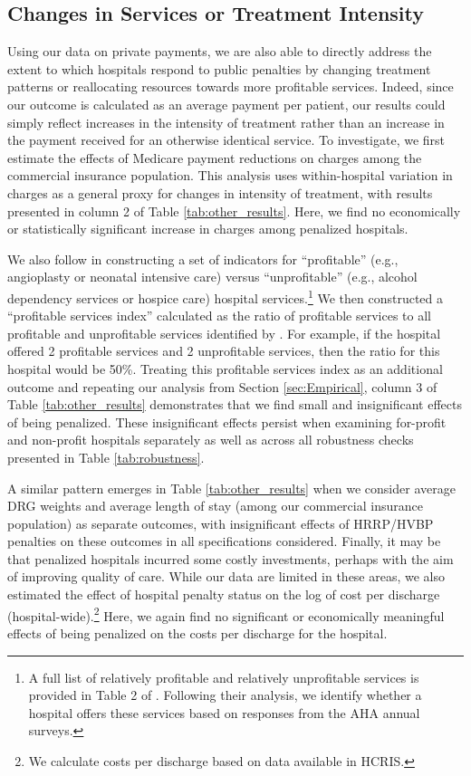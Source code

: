 \documentclass[12pt]{article}
\begin{document}
\subsection{Changes in Services or Treatment Intensity}
Using our data on private payments, we are also able to directly address the extent to which hospitals respond to public penalties by changing treatment patterns or reallocating resources towards more profitable services. Indeed, since our outcome is calculated as an average payment per patient, our results could simply reflect increases in the intensity of treatment rather than an increase in the payment received for an otherwise identical service.  To investigate, we first estimate the effects of Medicare payment reductions on charges among the commercial insurance population. This analysis uses within-hospital variation in charges as a general proxy for changes in intensity of treatment, with results presented in column 2 of Table \ref{tab:other_results}. Here, we find no economically or statistically significant increase in charges among penalized hospitals.

We also follow \cite{horwitz2009} in constructing a set of indicators for ``profitable'' (e.g., angioplasty or neonatal intensive care) versus ``unprofitable'' (e.g., alcohol dependency services or hospice care) hospital services.\footnote{A full list of relatively profitable and relatively unprofitable services is provided in Table 2 of \cite{horwitz2009}. Following their analysis, we identify whether a hospital offers these services based on responses from the AHA annual surveys.} We then constructed a ``profitable services index'' calculated as the ratio of profitable services to all profitable and unprofitable services identified by \cite{horwitz2009}. For example, if the hospital offered 2 profitable services and 2 unprofitable services, then the ratio for this hospital would be 50\%. Treating this profitable services index as an additional outcome and repeating our analysis from Section \ref{sec:Empirical}, column 3 of Table \ref{tab:other_results} demonstrates that we find small and insignificant effects of being penalized. These insignificant effects persist when examining for-profit and non-profit hospitals separately as well as across all robustness checks presented in Table \ref{tab:robustness}.

A similar pattern emerges in Table \ref{tab:other_results} when we consider average DRG weights and average length of stay (among our commercial insurance population) as separate outcomes, with insignificant effects of HRRP/HVBP penalties on these outcomes in all specifications considered.  Finally, it may be that penalized hospitals incurred some costly investments, perhaps with the aim of improving quality of care. While our data are limited in these areas, we also estimated the effect of hospital penalty status on the log of cost per discharge (hospital-wide).\footnote{We calculate costs per discharge based on data available in HCRIS.} Here, we again find no significant or economically meaningful effects of being penalized on the costs per discharge for the hospital.
\end{document}
